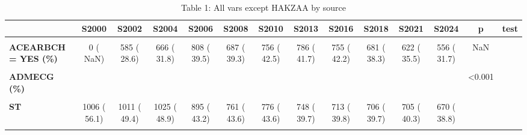 \documentclass[
]{article}
\author{}
\date{\vspace{-2.5em}}
\begin{document}
{
\setcounter{tocdepth}{2}
\tableofcontents
}
\begin{table}[H]
\centering
\caption{\label{tab:unnamed-chunk-2}Table 1: All vars except HAKZAA by source}
\centering
\begin{tabular}[t]{>{\raggedright\arraybackslash}p{5em}ccccccccccccc}
\toprule
  & S2000 & S2002 & S2004 & S2006 & S2008 & S2010 & S2013 & S2016 & S2018 & S2021 & S2024 & p & test\\
\midrule
\textbf{\cellcolor{gray!10}{n}} & \cellcolor{gray!10}{1793} & \cellcolor{gray!10}{2048} & \cellcolor{gray!10}{2094} & \cellcolor{gray!10}{2075} & \cellcolor{gray!10}{1746} & \cellcolor{gray!10}{1779} & \cellcolor{gray!10}{1885} & \cellcolor{gray!10}{1791} & \cellcolor{gray!10}{1778} & \cellcolor{gray!10}{1750} & \cellcolor{gray!10}{1755} & \cellcolor{gray!10}{} & \cellcolor{gray!10}{}\\
\textbf{ACEARBCH = YES (\%)} & 0 (  NaN) & 585 ( 28.6) & 666 ( 31.8) & 808 ( 39.5) & 687 ( 39.3) & 756 ( 42.5) & 786 ( 41.7) & 755 ( 42.2) & 681 ( 38.3) & 622 ( 35.5) & 556 ( 31.7) & NaN & \\
\textbf{\cellcolor{gray!10}{ADMDBP (mean (SD))}} & \cellcolor{gray!10}{80.95 (16.56)} & \cellcolor{gray!10}{81.76 (16.82)} & \cellcolor{gray!10}{81.43 (17.32)} & \cellcolor{gray!10}{80.83 (16.78)} & \cellcolor{gray!10}{81.88 (17.26)} & \cellcolor{gray!10}{80.74 (16.69)} & \cellcolor{gray!10}{79.93 (15.60)} & \cellcolor{gray!10}{81.66 (15.67)} & \cellcolor{gray!10}{82.13 (16.14)} & \cellcolor{gray!10}{82.87 (17.09)} & \cellcolor{gray!10}{83.32 (16.62)} & \cellcolor{gray!10}{<0.001} & \cellcolor{gray!10}{}\\
\textbf{ADMECG (\%)} &  &  &  &  &  &  &  &  &  &  &  & <0.001 & \\
\textbf{\cellcolor{gray!10}{NONST (EXCL. UND.ECG)}} & \cellcolor{gray!10}{729 ( 40.7)} & \cellcolor{gray!10}{969 ( 47.4)} & \cellcolor{gray!10}{1003 ( 47.9)} & \cellcolor{gray!10}{1073 ( 51.7)} & \cellcolor{gray!10}{922 ( 52.8)} & \cellcolor{gray!10}{939 ( 52.8)} & \cellcolor{gray!10}{1070 ( 56.8)} & \cellcolor{gray!10}{1001 ( 55.9)} & \cellcolor{gray!10}{1007 ( 56.6)} & \cellcolor{gray!10}{999 ( 57.1)} & \cellcolor{gray!10}{984 ( 57.0)} & \cellcolor{gray!10}{} & \cellcolor{gray!10}{}\\
\textbf{ST} & 1006 ( 56.1) & 1011 ( 49.4) & 1025 ( 48.9) & 895 ( 43.2) & 761 ( 43.6) & 776 ( 43.6) & 748 ( 39.7) & 713 ( 39.8) & 706 ( 39.7) & 705 ( 40.3) & 670 ( 38.8) &  & \\
\textbf{\cellcolor{gray!10}{UND. ECG}} & \cellcolor{gray!10}{57 (  3.2)} & \cellcolor{gray!10}{65 (  3.2)} & \cellcolor{gray!10}{66 (  3.2)} & \cellcolor{gray!10}{106 (  5.1)} & \cellcolor{gray!10}{63 (  3.6)} & \cellcolor{gray!10}{64 (  3.6)} & \cellcolor{gray!10}{67 (  3.6)} & \cellcolor{gray!10}{77 (  4.3)} & \cellcolor{gray!10}{65 (  3.7)} & \cellcolor{gray!10}{46 (  2.6)} & \cellcolor{gray!10}{73 (  4.2)} & \cellcolor{gray!10}{} & \cellcolor{gray!10}{}\\

\end{tabular}
\end{table}
\end{document}

